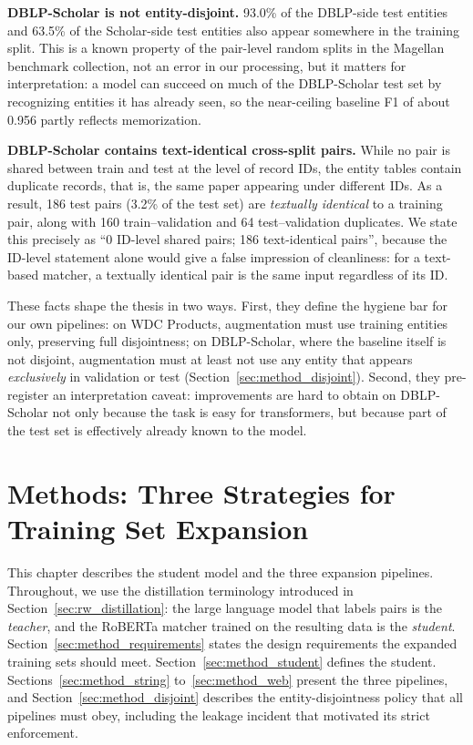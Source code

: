 \documentclass[a4paper,oneside,bibliography=totoc]{scrbook}
\begin{document}
\textbf{DBLP-Scholar is not entity-disjoint.} 93.0\% of the DBLP-side test entities and 63.5\% of the Scholar-side test entities also appear somewhere in the training split. This is a known property of the pair-level random splits in the Magellan benchmark collection, not an error in our processing, but it matters for interpretation: a model can succeed on much of the DBLP-Scholar test set by recognizing entities it has already seen, so the near-ceiling baseline F1 of about 0.956 partly reflects memorization.

\textbf{DBLP-Scholar contains text-identical cross-split pairs.} While no pair is shared between train and test at the level of record IDs, the entity tables contain duplicate records, that is, the same paper appearing under different IDs. As a result, 186 test pairs (3.2\% of the test set) are \emph{textually identical} to a training pair, along with 160 train--validation and 64 test--validation duplicates. We state this precisely as ``0 ID-level shared pairs; 186 text-identical pairs'', because the ID-level statement alone would give a false impression of cleanliness: for a text-based matcher, a textually identical pair is the same input regardless of its ID.

These facts shape the thesis in two ways. First, they define the hygiene bar for our own pipelines: on WDC Products, augmentation must use training entities only, preserving full disjointness; on DBLP-Scholar, where the baseline itself is not disjoint, augmentation must at least not use any entity that appears \emph{exclusively} in validation or test (Section~\ref{sec:method_disjoint}). Second, they pre-register an interpretation caveat: improvements are hard to obtain on DBLP-Scholar not only because the task is easy for transformers, but because part of the test set is effectively already known to the model.

\chapter{Methods: Three Strategies for Training Set Expansion}
\label{ch:methods}

This chapter describes the student model and the three expansion pipelines. Throughout, we use the distillation terminology introduced in Section~\ref{sec:rw_distillation}: the large language model that labels pairs is the \emph{teacher}, and the RoBERTa matcher trained on the resulting data is the \emph{student}. Section~\ref{sec:method_requirements} states the design requirements the expanded training sets should meet. Section~\ref{sec:method_student} defines the student. Sections~\ref{sec:method_string} to~\ref{sec:method_web} present the three pipelines, and Section~\ref{sec:method_disjoint} describes the entity-disjointness policy that all pipelines must obey, including the leakage incident that motivated its strict enforcement.
\end{document}
